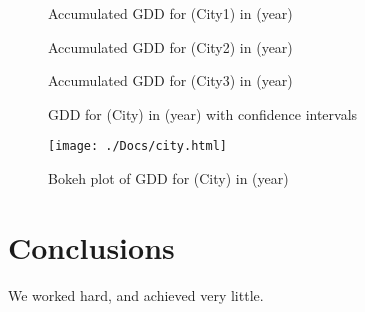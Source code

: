 \documentclass[12pt]{article}
\begin{document}
\begin{figure}[!htbp]
\centering
\caption{\scriptsize Accumulated GDD for (City1) in (year)}
\label{Label}		  
\end{figure}

\begin{figure}[!htbp]
\centering
\caption{\scriptsize Accumulated GDD for (City2) in (year)}
\label{Label}		  
\end{figure}
	
\begin{figure}[!htbp]
\centering
\caption{\scriptsize Accumulated GDD for (City3) in (year)}
\label{Label}		  
\end{figure}	

\begin{figure}[!htbp]
\centering
\caption{\scriptsize GDD for (City) in (year) with confidence intervals}
\label{Label}		  
\end{figure}

\begin{figure}[!htbp]
\centering
\texttt{[image: ./Docs/city.html]} 
\caption{\scriptsize Bokeh plot of GDD for (City) in (year)}
\label{Label}		  
\end{figure}

\pagebreak

\section{Conclusions}\label{conclusions}
We worked hard, and achieved very little.



\end{document}
